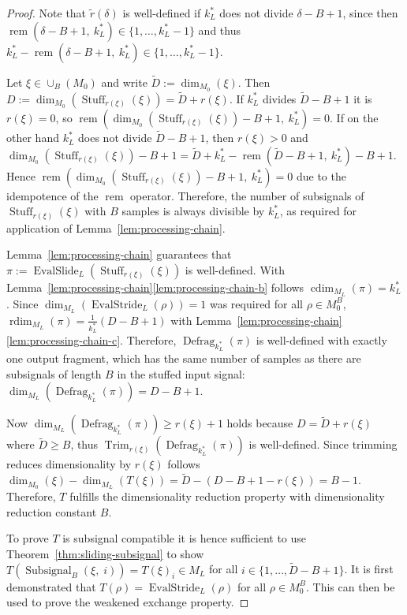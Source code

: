 \documentclass[journal]{IEEEtran}
\newcommand{\ROI}{B}
\newcommand{\discint}[2]{\{#1,\dotsc,#2\}}
\newcommand{\inint}[2]{\in\discint{#1}{#2}}
\DeclareMathOperator{\rdim}{rdim}
\DeclareMathOperator{\cdim}{cdim}
\DeclareMathOperator{\Subsignal}{Subsignal}
\DeclareMathOperator{\Defragmentation}{Defrag}
\DeclareMathOperator{\EvalStride}{EvalStride}
\DeclareMathOperator{\EvalSlide}{EvalSlide}
\DeclareMathOperator{\Stuffing}{Stuff}
\DeclareMathOperator{\Trimming}{Trim}
\newcommand{\rem}[2]{\operatorname{rem}(#1,\ #2)}
\begin{document}
\begin{proof}
Note that $\tilde{r}(\delta)$ is well-defined if $k_L^*$ does not divide $\delta - \ROI + 1$, since then $\rem{\delta - \ROI + 1}{k_L^*}\inint{1}{k_L^* - 1}$ and thus $k_L^* - \rem{\delta - \ROI + 1}{k_L^*}\inint{1}{k_L^* - 1}$.

Let $\xi\in\cup_\ROI(M_0)$ and write $\tilde{D} := \dim_{M_0}(\xi)$.
Then $D := \dim_{M_0}(\Stuffing_{r(\xi)}(\xi)) = \tilde{D} + r(\xi)$.
If $k_L^*$ divides $\tilde{D} - \ROI + 1$ it is $r(\xi) = 0$, so $\rem{ \dim_{M_0}(\Stuffing_{r(\xi)}(\xi)) - \ROI + 1 }{k_L^*} = 0$.
If on the other hand $k_L^*$ does not divide $\tilde{D} - \ROI + 1$, then $r(\xi) > 0$ and
$\dim_{M_0}(\Stuffing_{r(\xi)}(\xi)) - \ROI + 1 = \tilde{D} + k_L^* - \rem{\tilde{D} - \ROI + 1}{k_L^*} - \ROI + 1$.
Hence $\rem{ \dim_{M_0}(\Stuffing_{r(\xi)}(\xi)) - \ROI + 1 }{k_L^*} = 0$ due to the idempotence of the $\operatorname{rem}$ operator.
Therefore, the number of subsignals of $\Stuffing_{r(\xi)}(\xi)$ with $\ROI$ samples is always divisible by $k_L^*$, as required for application of Lemma~\ref{lem:processing-chain}.

Lemma~\ref{lem:processing-chain} guarantees that $\pi := \EvalSlide_L( \Stuffing_{r(\xi)}(\xi) )$ is well-defined.
With Lemma~\ref{lem:processing-chain}\ref{lem:processing-chain-b} follows $\cdim_{M_L}(\pi) = k_L^*$.
Since $\dim_{M_L}(\EvalStride_L(\rho)) = 1$ was required for all $\rho\in M_0^\ROI$, $\rdim_{M_L}(\pi) = \frac{1}{k_L^*}(D - \ROI + 1)$ with Lemma~\ref{lem:processing-chain}\ref{lem:processing-chain-c}.
Therefore, $\Defragmentation_{k_L^*}(\pi)$ is well-defined with exactly one output fragment, which has the same number of samples as there are subsignals of length $B$ in the stuffed input signal: $\dim_{M_L}(\Defragmentation_{k_L^*}(\pi)) = D - \ROI + 1$.

Now $\dim_{M_L}(\Defragmentation_{k_L^*}(\pi)) \geq r(\xi) + 1$ holds because $D = \tilde{D} + r(\xi)$ where $\tilde{D} \geq \ROI$, thus $\Trimming_{r(\xi)}(\Defragmentation_{k_L^*}(\pi))$ is well-defined.
Since trimming reduces dimensionality by $r(\xi)$ follows
$\dim_{M_0}(\xi) - \dim_{M_L}(T(\xi)) = \tilde{D} - (D - \ROI + 1 - r(\xi)) = \ROI - 1$.
Therefore, $T$ fulfills the dimensionality reduction property with dimensionality reduction constant $\ROI$.

To prove $T$ is subsignal compatible it is hence sufficient to use Theorem~\ref{thm:sliding-subsignal} to show $T(\Subsignal_\ROI(\xi,\;i)) = T(\xi)_i\in M_L$ for all $i\inint{1}{\tilde{D} - \ROI + 1}$.
It is first demonstrated that $T(\rho) = \EvalStride_L(\rho)$ for all $\rho\in M_0^\ROI$.
This can then be used to prove the weakened exchange property.


\end{proof}
\end{document}
